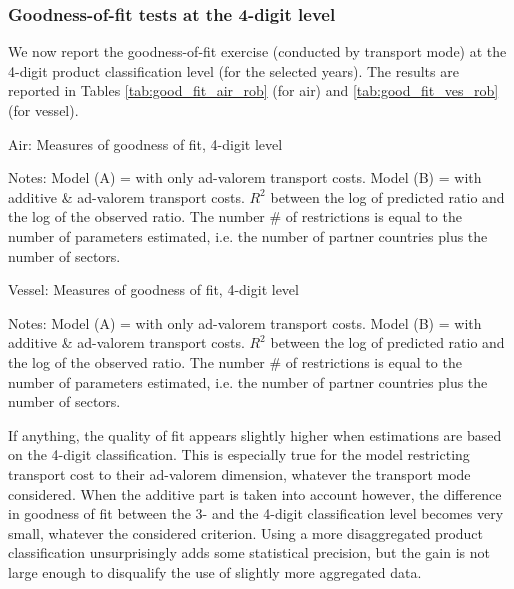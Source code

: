 \documentclass[11pt,twoside, authoryear]{elsarticle}
\begin{document}
\subsubsection{Goodness-of-fit tests at the 4-digit level}

We now report the goodness-of-fit exercise (conducted by transport mode) at the 4-digit product classification level (for the selected years).
The results are reported in Tables \ref{tab:good_fit_air_rob} (for air) and \ref{tab:good_fit_ves_rob} (for vessel).

\begin{table}[htbp]
	\centering
		\caption{Air: Measures of goodness of fit, 4-digit level}
		\label{tab:good_fit_air_rob}%
		
{\parbox[l]{12cm}{
			\scriptsize{Notes: Model (A) = with only ad-valorem transport costs. Model (B) = with additive \& ad-valorem transport costs. $R^{2}$ between the log of predicted ratio and the log of the observed ratio. The number \# of restrictions is equal to the number of parameters estimated, i.e. the number of partner countries plus the number of sectors. }}}
\end{table}

\begin{table}[htbp]
	\centering
		\caption{Vessel: Measures of goodness of fit, 4-digit level}
		\label{tab:good_fit_ves_rob}%
		
{\parbox[l]{12cm}{
			\scriptsize{ Notes: Model (A) = with only ad-valorem transport costs. Model (B) = with additive \& ad-valorem transport costs. $R^{2}$ between the log of predicted ratio and the log of the observed ratio. The number \# of restrictions is equal to the number of parameters estimated, i.e. the number of partner countries plus the number of sectors. }}}
	\end{table}



If anything, the quality of fit appears slightly higher when estimations are based on the 4-digit classification. This is especially true for the model restricting transport cost to their ad-valorem dimension, whatever the transport mode considered.
When the additive part is taken into account however, the difference in goodness of fit between the 3- and the 4-digit classification level becomes very small, whatever the considered criterion.
Using a more disaggregated product classification unsurprisingly adds some statistical precision, but the gain is not large enough to disqualify the use of slightly more aggregated data.
\end{document}
